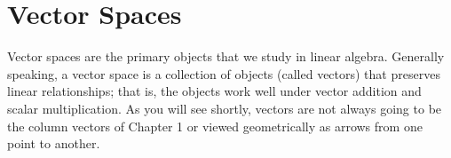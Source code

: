 \chapter{Vector Spaces}

Vector spaces are the primary objects that we study in linear algebra. Generally speaking, a vector space is a collection of objects (called vectors) that preserves linear relationships; that is, the objects work well under vector addition and scalar multiplication. As you will see shortly, vectors are not always going to be the column vectors of Chapter 1 or viewed geometrically as arrows from one point to another.
\begin{annotation}
\end{annotation}
